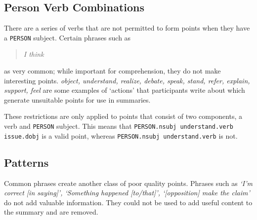     \tocless\subsection{Person Verb Combinations}
    There are a series of verbs that are not permitted to form points when they have a \texttt{PERSON} subject. Certain phrases such as \blockquote{\textit{I think}} as very common; while important for comprehension, they do not make interesting points. \textit{object, understand, realize, debate, speak, stand, refer, explain, support, feel} are some examples of `actions' that participants write about which generate unsuitable points for use in summaries.

      These restrictions are only applied to points that consist of two components, a verb and \texttt{PERSON} subject. This means that \texttt{PERSON.nsubj understand.verb issue.dobj} is a valid point, whereas \texttt{PERSON.nsubj understand.verb} is not.

    \tocless\subsection{Patterns}
      Common phrases create another class of poor quality points. Phrases such as \textit{`I'm correct [in saying]', `Something happened [to/that]', `[opposition] make the claim'} do not add valuable information. They could not be used to add useful content to the summary and are removed.
